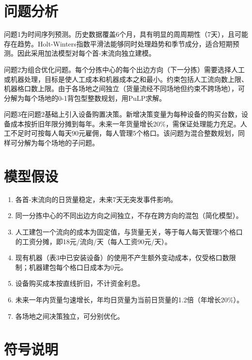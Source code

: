 \documentclass[12pt,a4paper]{ctexart}
\begin{document}
\section{问题分析}

问题1为时间序列预测。历史数据覆盖6个月，具有明显的周周期性（7天），且可能存在趋势。Holt-Winters指数平滑法能够同时处理趋势和季节成分，适合短期预测。因此采用加法模型对每个首-末流向独立建模。

问题2为组合优化问题。每个分拣中心的每个出边方向（下一分拣）需要选择人工或机器处理，目标是使人工成本和机器成本之和最小。约束包括人工流向数上限、机器格口数上限。由于各场地之间独立（货量流经不同场地但约束不跨场地），可分解为每个场地的0-1背包型整数规划，用PuLP求解。

问题3在问题2基础上引入设备购置决策。新增决策变量为每种设备的购买台数，设备成本按折旧年限分摊到每年。未来一年货量增长20\%，需保证处理能力充足。人工不足时可按每人每天90元雇佣，每人管理5个格口。该问题为混合整数规划，同样可分解为每个场地的子问题。

\section{模型假设}

\begin{enumerate}
    \item 各首-末流向的日货量稳定，未来7天无突发事件影响。
    \item 同一分拣中心的不同出边方向之间独立，不存在跨方向的混包（简化模型）。
    \item 人工建包一个流向的成本为固定值，与货量无关，等于每人每天管理5个格口的工资分摊，即18元/流向/天（每人工资90元/天）。
    \item 现有机器（表3中已安装设备）的使用不产生额外变动成本，仅受格口数限制；机器建包每个格口日成本为0元。
    \item 设备购买成本按直线折旧，不计资金利息。
    \item 未来一年内货量匀速增长，年均日货量为当前日货量的1.2倍（年增长20\%）。
    \item 各场地之间决策独立，可分别优化。
\end{enumerate}

\section{符号说明}
\end{document}
